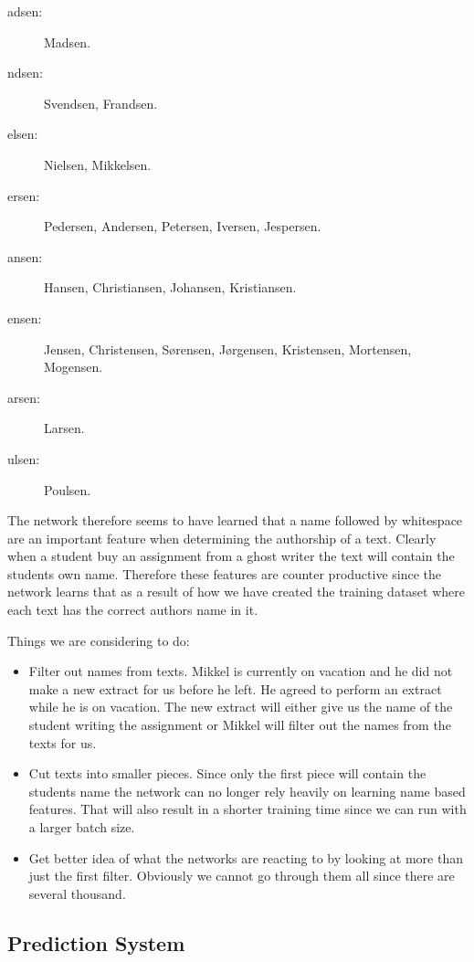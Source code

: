 \begin{description}
    \item[adsen:] Madsen.
    \item[ndsen:] Svendsen, Frandsen.
    \item[elsen:] Nielsen, Mikkelsen.
    \item[ersen:] Pedersen, Andersen, Petersen, Iversen, Jespersen.
    \item[ansen:] Hansen, Christiansen, Johansen, Kristiansen.
    \item[ensen:] Jensen, Christensen, S\o rensen, J\o rgensen, Kristensen,
        Mortensen, Mogensen.
    \item[arsen:] Larsen.
    \item[ulsen:] Poulsen.
\end{description}

The network therefore seems to have learned that a name followed by whitespace
are an important feature when determining the authorship of a text. Clearly when
a student buy an assignment from a ghost writer the text will contain the
students own name. Therefore these features are counter productive since the
network learns that as a result of how we have created the training dataset
where each text has the correct authors name in it.

Things we are considering to do:
\begin{itemize}
    \item Filter out names from texts. Mikkel is currently on vacation and he
        did not make a new extract for us before he left. He agreed to perform
        an extract while he is on vacation. The new extract will either give us
        the name of the student writing the assignment or Mikkel will filter out
        the names from the texts for us.
    \item Cut texts into smaller pieces. Since only the first piece will contain
        the students name the network can no longer rely heavily on learning
        name based features. That will also result in a shorter training time
        since we can run with a larger batch size.
    \item Get better idea of what the networks are reacting to by looking at
        more than just the first filter. Obviously we cannot go through them all
        since there are several thousand.
\end{itemize}


\subsection{Prediction System}

